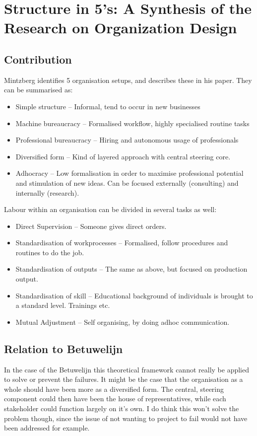 \documentclass[]{uva-bachelor-thesis}
\def \CurrChapter {}
\def \CurrSection {}
\renewcommand{\chaptermark}[1]{\def \CurrChapter {#1} \def \CurrSection {}}
\begin{document}
\chapter{Structure in 5's: A Synthesis of the Research on Organization Design \cite{structure-5}}

\section{Contribution}
Mintzberg identifies 5 organisation setups, and describes these in his paper. 
They can be summarised as:
\begin{itemize}
\item Simple structure -- Informal, tend to occur in new businesses
\item Machine bureaucracy -- Formalised workflow, highly specialised routine tasks
\item Professional bureaucracy -- Hiring and autonomous usage of professionals
\item Diversified form -- Kind of layered approach with central steering core.
\item Adhocracy -- Low formalisation in order to maximise professional potential and stimulation of new ideas. Can be focused externally (consulting) and internally (research). 
\end{itemize}

Labour within an organisation can be divided in several tasks as well:
\begin{itemize}
  \item Direct Supervision -- Someone gives direct orders.
  \item Standardisation of workprocesses -- Formalised, follow procedures and routines to do the job.
  \item Standardisation of outputs -- The same as above, but focused on production output.
  \item Standardisation of skill -- Educational background of individuals is brought to a standard level. Trainings etc. 
  \item Mutual Adjustment -- Self organising, by doing adhoc communication.
\end{itemize}

\section{Relation to Betuwelijn}
In the case of the Betuwelijn this theoretical framework cannot really be applied to solve or prevent the failures. 
It might be the case that the organisation as a whole should have been more as a diversified form.
The central, steering component could then have been the house of representatives, while each stakeholder could function largely on it's own.
I do think this won't solve the problem though, since the issue of not wanting to project to fail would not have been addressed for example.



\chaptermark{Bibliography}
\end{document}
